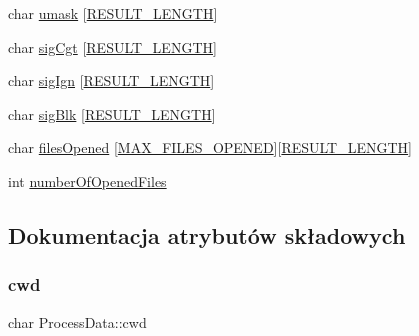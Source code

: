 \begin{DoxyCompactItemize}
\item 
char \mbox{\hyperlink{structProcessData_af94edbd72c39d98950ad7b4337c46c42}{umask}} \mbox{[}\mbox{\hyperlink{z6__13_8c_ad9699f597384c01411e910aae4c75b3f}{R\+E\+S\+U\+L\+T\+\_\+\+L\+E\+N\+G\+TH}}\mbox{]}
\item 
char \mbox{\hyperlink{structProcessData_a935413a7627d662bf41ecdb4477dc202}{sig\+Cgt}} \mbox{[}\mbox{\hyperlink{z6__13_8c_ad9699f597384c01411e910aae4c75b3f}{R\+E\+S\+U\+L\+T\+\_\+\+L\+E\+N\+G\+TH}}\mbox{]}
\item 
char \mbox{\hyperlink{structProcessData_a42a5f1eed5e28b5185fe07d0aa309399}{sig\+Ign}} \mbox{[}\mbox{\hyperlink{z6__13_8c_ad9699f597384c01411e910aae4c75b3f}{R\+E\+S\+U\+L\+T\+\_\+\+L\+E\+N\+G\+TH}}\mbox{]}
\item 
char \mbox{\hyperlink{structProcessData_a72c5b212928cf187e31e07e158a54de0}{sig\+Blk}} \mbox{[}\mbox{\hyperlink{z6__13_8c_ad9699f597384c01411e910aae4c75b3f}{R\+E\+S\+U\+L\+T\+\_\+\+L\+E\+N\+G\+TH}}\mbox{]}
\item 
char \mbox{\hyperlink{structProcessData_a9c942ade167598a79fed5d3cb2f352a5}{files\+Opened}} \mbox{[}\mbox{\hyperlink{z6__12__potomny_8c_a38540853065a7d4ca28efef2436fa521}{M\+A\+X\+\_\+\+F\+I\+L\+E\+S\+\_\+\+O\+P\+E\+N\+ED}}\mbox{]}\mbox{[}\mbox{\hyperlink{z6__13_8c_ad9699f597384c01411e910aae4c75b3f}{R\+E\+S\+U\+L\+T\+\_\+\+L\+E\+N\+G\+TH}}\mbox{]}
\item 
int \mbox{\hyperlink{structProcessData_aa254dccbd9e0931e69cb96df79f970eb}{number\+Of\+Opened\+Files}}
\end{DoxyCompactItemize}


\subsection{Dokumentacja atrybutów składowych}
\mbox{\label{structProcessData_a72e52a2fba172b6e53c28e5d3dbdcf22}} 
\subsubsection{\texorpdfstring{cwd}{cwd}}
{\footnotesize\ttfamily char Process\+Data\+::cwd}

\mbox{\label{structProcessData_a1881e7c254d2ef158e26ea23a7f238b3}} 
